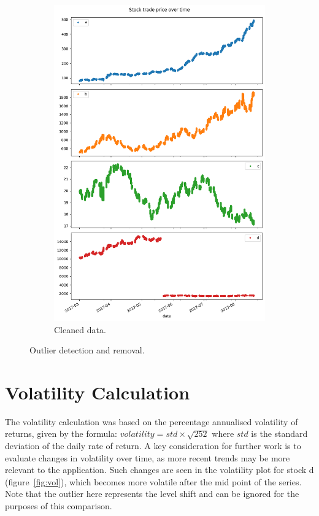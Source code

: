\documentclass[12pt]{article}
\begin{document}
\begin{figure}[ht]
\begin{subfigure}{.5\textwidth}
  \includegraphics[width=\linewidth]{cleaned-data.png}
  \caption{Cleaned data.}
\end{subfigure}
\caption{Outlier detection and removal.}\label{fig:outliers}
\end{figure}


\section{Volatility Calculation}
The volatility calculation was based on the percentage annualised volatility of returns, given by the formula: $volatility = std \times \sqrt{252}$ where $std$ is the standard deviation of the daily rate of return. A key consideration for further work is to evaluate changes in volatility over time, as more recent trends may be more relevant to the application. Such changes are seen in the volatility plot for stock d (figure~\ref{fig:vol}), which becomes more volatile after the mid point of the series. Note that the outlier here represents the level shift and can be ignored for the purposes of this comparison.
\end{document}
